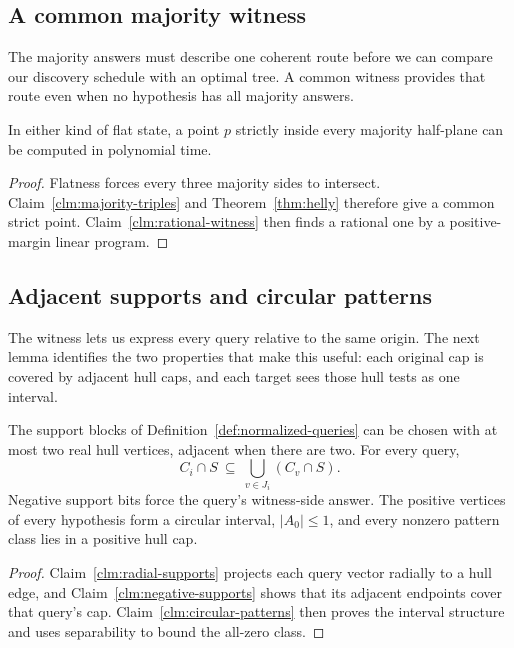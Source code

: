 \subsection{A common majority witness}

The majority answers must describe one coherent route before we can
compare our discovery schedule with an optimal tree. A common witness
provides that route even when no hypothesis has all majority answers.

\begin{lemma}\label{lem:helly}
In either kind of flat state, a point $p$ strictly inside every
majority half-plane can be computed in polynomial time.
\end{lemma}
\begin{proof}
Flatness forces every three majority sides to intersect.
Claim~\ref{clm:majority-triples} and Theorem~\ref{thm:helly}
therefore give a common strict point. Claim~\ref{clm:rational-witness}
then finds a rational one by a positive-margin linear program.
\end{proof}

\subsection{Adjacent supports and circular patterns}

The witness lets us express every query relative to the same origin.
The next lemma identifies the two properties that make this useful:
each original cap is covered by adjacent hull caps, and each target
sees those hull tests as one interval.

\begin{lemma}\label{lem:hull-structure}
The support blocks of Definition~\ref{def:normalized-queries} can
be chosen with at most two real hull vertices, adjacent when there
are two. For every query,
\begin{equation}\label{eq:hull-cap-cover}
 C_i\cap S\ \subseteq\ \bigcup_{v\in J_i}(C_v\cap S).
\end{equation}
Negative support bits force the query's witness-side answer.
The positive vertices of every hypothesis form a circular interval,
$|A_0|\le1$, and every nonzero pattern class lies in a positive hull cap.
\end{lemma}
\begin{proof}
Claim~\ref{clm:radial-supports} projects each query vector radially
to a hull edge, and Claim~\ref{clm:negative-supports} shows that
its adjacent endpoints cover that query's cap.
Claim~\ref{clm:circular-patterns} then proves the interval structure
and uses separability to bound the all-zero class.
\end{proof}


